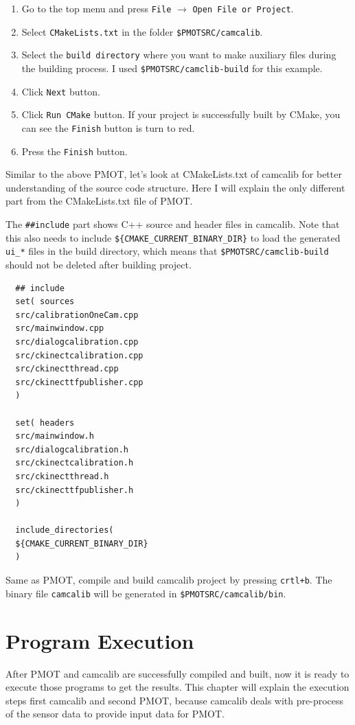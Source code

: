 \documentclass[a4paper,twoside, openright,12pt]{report}
\begin{document}
\begin{enumerate}
	\item Go to the top menu and press \verb|File| $\rightarrow$ \verb|Open File or Project|.
	\item Select \verb|CMakeLists.txt| in the folder \verb|$PMOTSRC/camcalib|.  
	\item Select the \verb|build directory| where you want to make auxiliary files during the building process. 
	I used \verb|$PMOTSRC/camclib-build| for this example. 
	\item Click \verb|Next| button. 
	\item Click \verb|Run CMake| button. If your project is successfully built by CMake, you can see the \verb|Finish| button is turn to red. 
	\item Press the \verb|Finish| button. 
\end{enumerate}

Similar to the above PMOT, let's look at CMakeLists.txt of camcalib for better understanding of the source code structure.
Here I will explain the only different part from the CMakeLists.txt file of PMOT.

The \verb|##include| part shows C++ source and header files in camcalib. Note that this also needs to include \verb|${CMAKE_CURRENT_BINARY_DIR}| to load the generated \verb|ui_*| files in the build directory, which means that \verb|$PMOTSRC/camclib-build| should not be deleted after building project.
\begin{verbatim}
  ## include
  set( sources
  src/calibrationOneCam.cpp
  src/mainwindow.cpp
  src/dialogcalibration.cpp
  src/ckinectcalibration.cpp
  src/ckinectthread.cpp
  src/ckinecttfpublisher.cpp
  )  

  set( headers
  src/mainwindow.h
  src/dialogcalibration.h
  src/ckinectcalibration.h
  src/ckinectthread.h
  src/ckinecttfpublisher.h
  )

  include_directories(
  ${CMAKE_CURRENT_BINARY_DIR}
  )
\end{verbatim}

Same as PMOT, compile and build camcalib project by pressing \verb|crtl+b|. The binary file \verb|camcalib| will be generated in \verb|$PMOTSRC/camcalib/bin|.
\chapter{Program Execution}

After PMOT and camcalib are successfully compiled and built, now it is ready to execute those programs to get the results. This chapter will explain the execution steps first camcalib and second PMOT, because camcalib deals with pre-process of the sensor data to provide input data for PMOT. 
\end{document}
